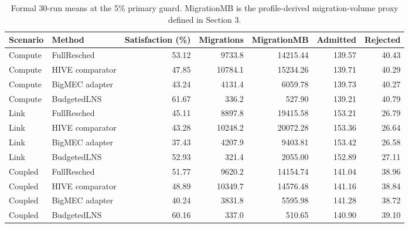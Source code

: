 \begin{table}[H]
\centering
\caption{Formal 30-run means at the 5\% primary guard. MigrationMB is the profile-derived migration-volume proxy defined in Section 3.}
\label{tab:main-results}
\scriptsize
\setlength{\tabcolsep}{3.5pt}
\begin{tabular}{llrrrrr}
\toprule
Scenario & Method & Satisfaction (\%) & Migrations & MigrationMB & Admitted & Rejected \\
\midrule
Compute & FullResched & 53.12 & 9733.8 & 14215.44 & 139.57 & 40.43 \\
Compute & HIVE comparator & 47.85 & 10784.1 & 15234.26 & 139.71 & 40.29 \\
Compute & BigMEC adapter & 43.24 & 4131.4 & 6059.78 & 139.73 & 40.27 \\
Compute & BudgetedLNS & 61.67 & 336.2 & 527.90 & 139.21 & 40.79 \\
\addlinespace
Link & FullResched & 45.11 & 8897.8 & 19415.58 & 153.21 & 26.79 \\
Link & HIVE comparator & 43.28 & 10248.2 & 20072.28 & 153.36 & 26.64 \\
Link & BigMEC adapter & 37.43 & 4207.9 & 9403.81 & 153.42 & 26.58 \\
Link & BudgetedLNS & 52.93 & 321.4 & 2055.00 & 152.89 & 27.11 \\
\addlinespace
Coupled & FullResched & 51.77 & 9620.2 & 14154.74 & 141.04 & 38.96 \\
Coupled & HIVE comparator & 48.89 & 10349.7 & 14576.48 & 141.16 & 38.84 \\
Coupled & BigMEC adapter & 40.24 & 3831.8 & 5595.98 & 141.28 & 38.72 \\
Coupled & BudgetedLNS & 60.16 & 337.0 & 510.65 & 140.90 & 39.10 \\
\bottomrule
\end{tabular}
\end{table}
